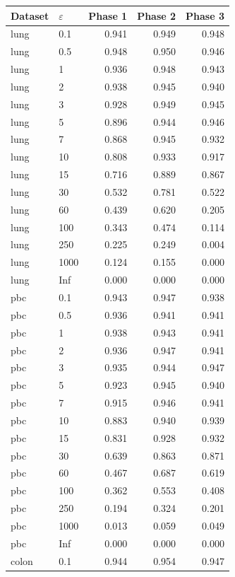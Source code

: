 \begin{tabular}{llrrr}
  \toprule
Dataset & $\varepsilon$ & Phase 1 & Phase 2 & Phase 3 \\ 
  \midrule
lung & 0.1 & 0.941 & 0.949 & 0.948 \\ 
  lung & 0.5 & 0.948 & 0.950 & 0.946 \\ 
  lung & 1 & 0.936 & 0.948 & 0.943 \\ 
  lung & 2 & 0.938 & 0.945 & 0.940 \\ 
  lung & 3 & 0.928 & 0.949 & 0.945 \\ 
  lung & 5 & 0.896 & 0.944 & 0.946 \\ 
  lung & 7 & 0.868 & 0.945 & 0.932 \\ 
  lung & 10 & 0.808 & 0.933 & 0.917 \\ 
  lung & 15 & 0.716 & 0.889 & 0.867 \\ 
  lung & 30 & 0.532 & 0.781 & 0.522 \\ 
  lung & 60 & 0.439 & 0.620 & 0.205 \\ 
  lung & 100 & 0.343 & 0.474 & 0.114 \\ 
  lung & 250 & 0.225 & 0.249 & 0.004 \\ 
  lung & 1000 & 0.124 & 0.155 & 0.000 \\ 
  lung & Inf & 0.000 & 0.000 & 0.000 \\ 
  pbc & 0.1 & 0.943 & 0.947 & 0.938 \\ 
  pbc & 0.5 & 0.936 & 0.941 & 0.941 \\ 
  pbc & 1 & 0.938 & 0.943 & 0.941 \\ 
  pbc & 2 & 0.936 & 0.947 & 0.941 \\ 
  pbc & 3 & 0.935 & 0.944 & 0.947 \\ 
  pbc & 5 & 0.923 & 0.945 & 0.940 \\ 
  pbc & 7 & 0.915 & 0.946 & 0.941 \\ 
  pbc & 10 & 0.883 & 0.940 & 0.939 \\ 
  pbc & 15 & 0.831 & 0.928 & 0.932 \\ 
  pbc & 30 & 0.639 & 0.863 & 0.871 \\ 
  pbc & 60 & 0.467 & 0.687 & 0.619 \\ 
  pbc & 100 & 0.362 & 0.553 & 0.408 \\ 
  pbc & 250 & 0.194 & 0.324 & 0.201 \\ 
  pbc & 1000 & 0.013 & 0.059 & 0.049 \\ 
  pbc & Inf & 0.000 & 0.000 & 0.000 \\ 
  colon & 0.1 & 0.944 & 0.954 & 0.947 \\ 

\end{tabular}
